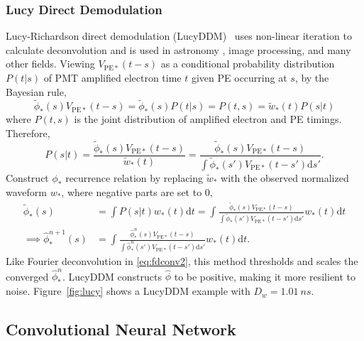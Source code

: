 \subsubsection{Lucy Direct Demodulation}

Lucy-Richardson direct demodulation (LucyDDM)~\cite{lucy_iterative_1974} uses non-linear iteration to calculate deconvolution and is used in astronomy \cite{li_richardson-lucy_2019}, image processing, and many other fields.  Viewing $V_{\mathrm{PE}*}(t-s)$ as a conditional probability distribution $P(t|s)$ of PMT amplified electron time $t$ given PE occurring at $s$, by the Bayesian rule,
\begin{equation}
  \label{eq:lucy}
  \tilde{\phi}_*(s) V_{\mathrm{PE}*}(t-s) = \tilde{\phi}_*(s)P(t|s) = P(t,s) = \tilde{w}_*(t)P(s|t)
\end{equation}
where $P(t,s)$ is the joint distribution of amplified electron and PE timings.  Therefore,
\begin{equation}
  \label{eq:ptt}
  P(s|t) = \frac{\tilde{\phi}_*(s) V_{\mathrm{PE}*}(t-s)}{\tilde{w}_*(t)} = \frac{\tilde{\phi}_*(s) V_{\mathrm{PE}*}(t-s)}{\int\tilde{\phi}_*(s') V_{\mathrm{PE}*}(t-s')\mathrm{d}s'}.
\end{equation}
Construct $\phi_*$ recurrence relation by replacing $\tilde{w}_*$ with the observed normalized waveform $w_*$, where negative parts are set to 0,
\begin{equation}
  \label{eq:iter}
  \begin{aligned}
    \tilde{\phi}_*(s) & = \int P(s|t) w_*(t)\mathrm{d}t =  \int \frac{\tilde{\phi}_*(s) V_{\mathrm{PE}*}(t-s)}{\int\tilde{\phi}_*(s') V_{\mathrm{PE}*}(t-s')\mathrm{d}s'} w_*(t) \mathrm{d}t \\
    \implies \hat{\phi}_*^{n+1}(s) & = \int \frac{\hat{\phi}_*^n(s) V_{\mathrm{PE}*}(t-s)}{\int\hat{\phi}_*^n(s') V_{\mathrm{PE}*}(t-s')\mathrm{d}s'} w_*(t) \mathrm{d}t.
  \end{aligned}
\end{equation}
Like Fourier deconvolution in \eqref{eq:fdconv2}, this method thresholds and scales the converged $\hat{\phi}_*^{n}$. LucyDDM constructs $\hat{\phi}$ to be positive, making it more resilient to noise.  Figure~\ref{fig:lucy} shows a LucyDDM example with $D_w = \SI{1.01}{ns}$.

\subsection{Convolutional Neural Network}

